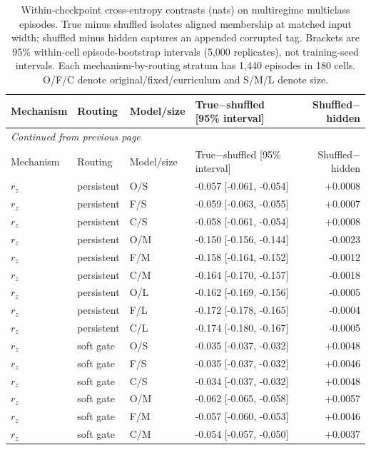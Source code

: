 \begingroup\footnotesize\setlength{\tabcolsep}{4pt}\setlength\LTleft{0pt}\setlength\LTright{0pt}
\begin{longtable}{@{}lllp{4.4cm}r@{}}
\caption{Within-checkpoint cross-entropy contrasts (nats) on multiregime multiclass episodes. True minus shuffled isolates aligned membership at matched input width; shuffled minus hidden captures an appended corrupted tag. Brackets are 95\% within-cell episode-bootstrap intervals (5,000 replicates), not training-seed intervals. Each mechanism-by-routing stratum has 1,440 episodes in 180 cells. O/F/C denote original/fixed/curriculum and S/M/L denote size.}\label{tab:tagcontrasts}\\
\toprule Mechanism & Routing & Model/size & True$-$shuffled [95\% interval] & Shuffled$-$hidden\\\midrule\endfirsthead
\multicolumn{5}{l}{\emph{Continued from previous page}}\\\toprule Mechanism & Routing & Model/size & True$-$shuffled [95\% interval] & Shuffled$-$hidden\\\midrule\endhead
\bottomrule\endfoot
$r_z$ & persistent & O/S & -0.057 [-0.061, -0.054] & +0.0008\\
$r_z$ & persistent & F/S & -0.059 [-0.063, -0.055] & +0.0007\\
$r_z$ & persistent & C/S & -0.058 [-0.061, -0.054] & +0.0008\\
$r_z$ & persistent & O/M & -0.150 [-0.156, -0.144] & -0.0023\\
$r_z$ & persistent & F/M & -0.158 [-0.164, -0.152] & -0.0012\\
$r_z$ & persistent & C/M & -0.164 [-0.170, -0.157] & -0.0018\\
$r_z$ & persistent & O/L & -0.162 [-0.169, -0.156] & -0.0005\\
$r_z$ & persistent & F/L & -0.172 [-0.178, -0.165] & -0.0004\\
$r_z$ & persistent & C/L & -0.174 [-0.180, -0.167] & -0.0005\\
\midrule
$r_z$ & soft gate & O/S & -0.035 [-0.037, -0.032] & +0.0048\\
$r_z$ & soft gate & F/S & -0.035 [-0.037, -0.032] & +0.0046\\
$r_z$ & soft gate & C/S & -0.034 [-0.037, -0.032] & +0.0048\\
$r_z$ & soft gate & O/M & -0.062 [-0.065, -0.058] & +0.0057\\
$r_z$ & soft gate & F/M & -0.057 [-0.060, -0.053] & +0.0046\\
$r_z$ & soft gate & C/M & -0.054 [-0.057, -0.050] & +0.0037\\

\end{longtable}
